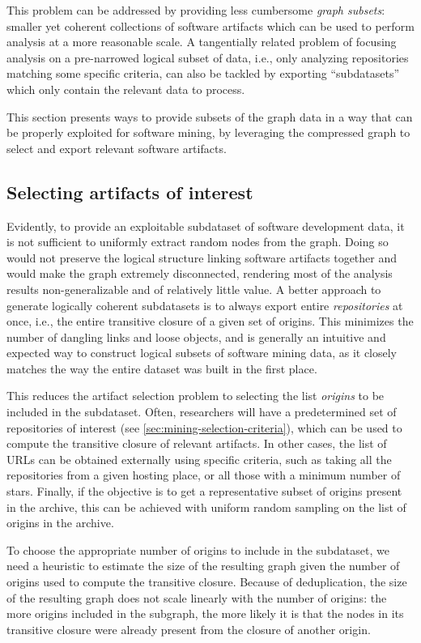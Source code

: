 This problem can be addressed by providing less cumbersome \emph{graph
subsets}: smaller yet coherent collections of software artifacts which can be
used to perform analysis at a more reasonable scale. A tangentially related
problem of focusing analysis on a pre-narrowed logical subset of data, i.e.,
only analyzing repositories matching some specific criteria, can also be
tackled by exporting ``subdatasets'' which only contain the relevant data to
process.

This section presents ways to provide subsets of the graph data in a way that
can be properly exploited for software mining, by leveraging the compressed
graph to select and export relevant software artifacts.

\subsection{Selecting artifacts of interest}

Evidently, to provide an exploitable subdataset of software development data,
it is not sufficient to uniformly extract random nodes from the graph. Doing so
would not preserve the logical structure linking software artifacts together
and would make the graph extremely disconnected, rendering most of the analysis
results non-generalizable and of relatively little value.
%
A better approach to generate logically coherent subdatasets is to always
export entire \emph{repositories} at once, i.e., the entire transitive closure
of a given set of origins. This minimizes the number of dangling links and
loose objects, and is generally an intuitive and expected way to construct
logical subsets of software mining data, as it closely matches the way the
entire dataset was built in the first place.

This reduces the artifact selection problem to selecting the list
\emph{origins} to be included in the subdataset.
Often, researchers will have a predetermined set of repositories of interest
(see \cref{sec:mining-selection-criteria}), which can be used to compute the
transitive closure of relevant artifacts. In other cases, the list of URLs
can be obtained externally using specific criteria, such as taking all the
repositories from a given hosting place, or all those with a minimum number of
stars. Finally, if the objective is to get a representative subset of origins
present in the archive, this can be achieved with uniform random sampling on
the list of origins in the archive.

To choose the appropriate number of origins to include in the subdataset, we
need a heuristic to estimate the size of the resulting graph given the number
of origins used to compute the transitive closure. Because of deduplication,
the size of the resulting graph does not scale linearly with the number of
origins: the more origins included in the subgraph, the more likely it is that
the nodes in its transitive closure were already present from the closure of
another origin.

